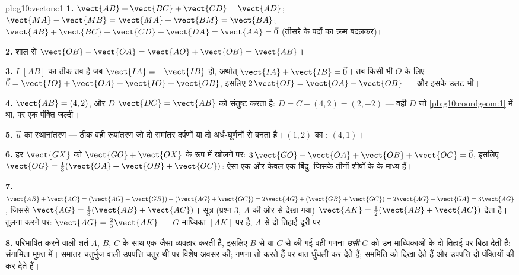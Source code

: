 \begin{solution}{pb:g10:vectors:1}
\textbf{1.} $\vect{AB} + \vect{BC} + \vect{CD} = \vect{AD}$; \quad $\vect{MA} - \vect{MB} = \vect{MA} + \vect{BM} =
\vect{BA}$; \quad $\vect{AB} + \vect{BC} + \vect{CD} +
\vect{DA} = \vect{AA} = \vec 0$ (तीसरे  के पदों का क्रम बदलकर)।

\textbf{2.} शाल से $\vect{OB} - \vect{OA} = \vect{AO} + \vect{OB} =
\vect{AB}$।

\textbf{3.} $I$ $[AB]$ का  ठीक तब है जब $\vect{IA} = -\vect{IB}$ हो, अर्थात् $\vect{IA} + \vect{IB} = \vec 0$। तब
किसी भी $O$ के लिए $\vec 0 = \vect{IO} + \vect{OA} + \vect{IO} + \vect{OB}$, इसलिए $2\,\vect{OI} = \vect{OA} + \vect{OB}$ --- और इसके उलट भी।

\textbf{4.} $\vect{AB} = (4, 2)$, और $D$ $\vect{DC} = \vect{AB}$ को संतुष्ट करता है: $D = C - (4, 2) = (2, -2)$ --- वही $D$ जो
\cref{pb:g10:coordgeom:1} में था, पर एक पंक्ति जल्दी।

\textbf{5.}  $\vec u$ का स्थानांतरण --- ठीक वही रूपांतरण जो दो समांतर
दर्पणों या दो अर्ध-घूर्णनों से बनता है। $(1, 2)$ का : $(4, 1)$।

\textbf{6.} हर $\vect{GX}$ को $\vect{GO} + \vect{OX}$ के रूप में खोलने पर: $3\,\vect{GO} + \vect{OA} + \vect{OB} + \vect{OC} = \vec 0$, इसलिए $\vect{OG} = \frac13(\vect{OA} + \vect{OB} + \vect{OC})$: ऐसा
एक और केवल एक बिंदु, जिसके  तीनों शीर्षों के  के माध्य
हैं।

\textbf{7.} $\vect{AB} + \vect{AC} =
(\vect{AG} + \vect{GB}) + (\vect{AG} + \vect{GC})
= 2\vect{AG} + (\vect{GB} + \vect{GC})
= 2\vect{AG} - \vect{GA} = 3\vect{AG}$, जिससे $\vect{AG} = \frac13(\vect{AB} + \vect{AC})$।  सूत्र (प्रश्न 3, $A$ की ओर से
देखा गया) $\vect{AK} = \frac12(\vect{AB} + \vect{AC})$ देता है। तुलना करने पर: $\vect{AG} = \frac23\vect{AK}$ --- $G$ माध्यिका $[AK]$ पर
है, $A$ से दो-तिहाई दूरी पर।

\textbf{8.} परिभाषित करने वाली शर्त $A$, $B$, $C$ के साथ एक जैसा
व्यवहार करती है, इसलिए $B$ से या $C$ से की गई वही गणना \emph{उसी} $G$
को उन माध्यिकाओं के दो-तिहाई पर बिठा देती है: संगामिता मुफ़्त में। समांतर
चतुर्भुज वाली उपपत्ति चतुर थी पर विशेष अवसर की;  गणना तो करते हैं
पर बात धुँधली कर देते हैं;  सममिति को दिखा देते हैं और उपपत्ति दो
पंक्तियों की कर देते हैं।


\end{solution}
